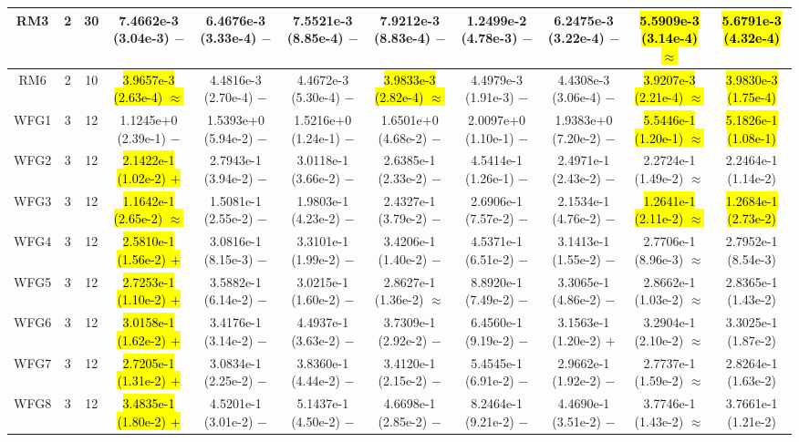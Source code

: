 \documentclass[journal]{IEEEtran}
\begin{document}
\begin{table*}[htbp]
\begin{tabular}{ccccccccccc}
\hline
\multirow{1}{*}{RM3}&2&30&7.4662e-3 (3.04e-3) $-$&6.4676e-3 (3.33e-4) $-$&7.5521e-3 (8.85e-4) $-$&7.9212e-3 (8.83e-4) $-$&1.2499e-2 (4.78e-3) $-$&6.2475e-3 (3.22e-4) $-$&\hl{5.5909e-3 (3.14e-4) $\approx$}&\hl{5.6791e-3 (4.32e-4)}\\
\hline
\multirow{1}{*}{RM6}&2&10&\hl{3.9657e-3 (2.63e-4) $\approx$}&4.4816e-3 (2.70e-4) $-$&4.4672e-3 (5.30e-4) $-$&\hl{3.9833e-3 (2.82e-4) $\approx$}&4.4979e-3 (1.91e-3) $-$&4.4308e-3 (3.06e-4) $-$&\hl{3.9207e-3 (2.21e-4) $\approx$}&\hl{3.9830e-3 (1.75e-4)}\\
\hline
\multirow{1}{*}{WFG1}&3&12&1.1245e+0 (2.39e-1) $-$&1.5393e+0 (5.94e-2) $-$&1.5216e+0 (1.24e-1) $-$&1.6501e+0 (4.68e-2) $-$&2.0097e+0 (1.10e-1) $-$&1.9383e+0 (7.20e-2) $-$&\hl{5.5446e-1 (1.20e-1) $\approx$}&\hl{5.1826e-1 (1.08e-1)}\\
\hline
\multirow{1}{*}{WFG2}&3&12&\hl{2.1422e-1 (1.02e-2) $+$}&2.7943e-1 (3.94e-2) $-$&3.0118e-1 (3.66e-2) $-$&2.6385e-1 (2.33e-2) $-$&4.5414e-1 (1.26e-1) $-$&2.4971e-1 (2.43e-2) $-$&2.2724e-1 (1.49e-2) $\approx$&2.2464e-1 (1.14e-2)\\
\hline
\multirow{1}{*}{WFG3}&3&12&\hl{1.1642e-1 (2.65e-2) $\approx$}&1.5081e-1 (2.55e-2) $-$&1.9803e-1 (4.23e-2) $-$&2.4327e-1 (3.79e-2) $-$&2.6906e-1 (7.57e-2) $-$&2.1534e-1 (4.76e-2) $-$&\hl{1.2641e-1 (2.11e-2) $\approx$}&\hl{1.2684e-1 (2.73e-2)}\\
\hline
\multirow{1}{*}{WFG4}&3&12&\hl{2.5810e-1 (1.56e-2) $+$}&3.0816e-1 (8.15e-3) $-$&3.3101e-1 (1.99e-2) $-$&3.4206e-1 (1.40e-2) $-$&4.5371e-1 (6.51e-2) $-$&3.1413e-1 (1.55e-2) $-$&2.7706e-1 (8.96e-3) $\approx$&2.7952e-1 (8.54e-3)\\
\hline
\multirow{1}{*}{WFG5}&3&12&\hl{2.7253e-1 (1.10e-2) $+$}&3.5882e-1 (6.14e-2) $-$&3.0215e-1 (1.60e-2) $-$&2.8627e-1 (1.36e-2) $\approx$&8.8920e-1 (7.49e-2) $-$&3.3065e-1 (4.86e-2) $-$&2.8662e-1 (1.03e-2) $\approx$&2.8365e-1 (1.43e-2)\\
\hline
\multirow{1}{*}{WFG6}&3&12&\hl{3.0158e-1 (1.62e-2) $+$}&3.4176e-1 (3.14e-2) $-$&4.4937e-1 (3.63e-2) $-$&3.7309e-1 (2.92e-2) $-$&6.4560e-1 (9.19e-2) $-$&3.1563e-1 (1.20e-2) $+$&3.2904e-1 (2.10e-2) $\approx$&3.3025e-1 (1.87e-2)\\
\hline
\multirow{1}{*}{WFG7}&3&12&\hl{2.7205e-1 (1.31e-2) $+$}&3.0834e-1 (2.25e-2) $-$&3.8360e-1 (4.44e-2) $-$&3.4120e-1 (2.15e-2) $-$&5.4545e-1 (6.91e-2) $-$&2.9662e-1 (1.92e-2) $-$&2.7737e-1 (1.59e-2) $\approx$&2.8264e-1 (1.63e-2)\\
\hline
\multirow{1}{*}{WFG8}&3&12&\hl{3.4835e-1 (1.80e-2) $+$}&4.5201e-1 (3.01e-2) $-$&5.1437e-1 (4.50e-2) $-$&4.6698e-1 (2.85e-2) $-$&8.2464e-1 (9.21e-2) $-$&4.4690e-1 (3.51e-2) $-$&3.7746e-1 (1.43e-2) $\approx$&3.7661e-1 (1.21e-2)\\

\end{tabular}
\end{table*}
\end{document}
